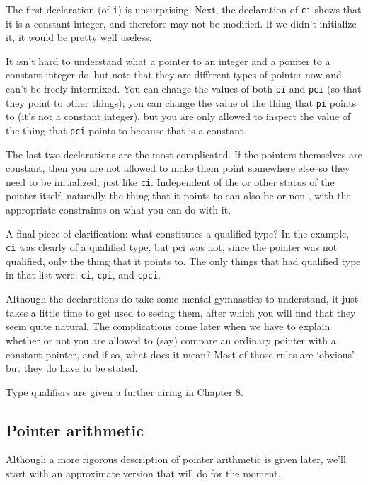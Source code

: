    The first declaration (of \texttt{i}) is unsurprising. Next, the
    declaration of \texttt{ci} shows that it is a constant integer, and
    therefore may not be modified. If we didn't initialize it, it would be
    pretty well useless.


   It isn't hard to understand what a pointer to an integer and a pointer
    to a constant integer do--but note that they are different types of
    pointer now and can't be freely intermixed. You can change the values of
    both \texttt{pi} and \texttt{pci} (so that they point to other
    things); you can change the value of the thing that \texttt{pi}
    points to (it's not a constant integer), but you are only allowed to
    inspect the value of the thing that \texttt{pci} points to because
    that is a constant.


   The last two declarations are the most complicated. If the pointers
    themselves are constant, then you are not allowed to make them point
    somewhere else--so they need to be initialized, just like
    \texttt{ci}. Independent of the \const{} or other status
    of the pointer itself, naturally the thing that it points to can also be
    \const{} or non-\const, with the appropriate
    constraints on what you can do with it.


   A final piece of clarification: what constitutes a qualified type? In
    the example, \texttt{ci} was clearly of a qualified type, but pci
    was not, since the pointer was not qualified, only the thing that it
    points to. The only things that had qualified type in that list were:
    \texttt{ci}, \texttt{cpi}, and \texttt{cpci}.


   Although the declarations do take some mental gymnastics to
    understand, it just takes a little time to get used to seeing them,
    after which you will find that they seem quite natural. The
    complications come later when we have to explain whether or not you are
    allowed to (say) compare an ordinary pointer with a constant pointer,
    and if so, what does it mean? Most of those rules are `obvious'
    but they do have to be stated.


   Type qualifiers are given a further airing in Chapter 8.


  

  \subsection{Pointer arithmetic}
   

   Although a more rigorous description of pointer arithmetic is given
    later, we'll start with an approximate version that will do for the
    moment.


